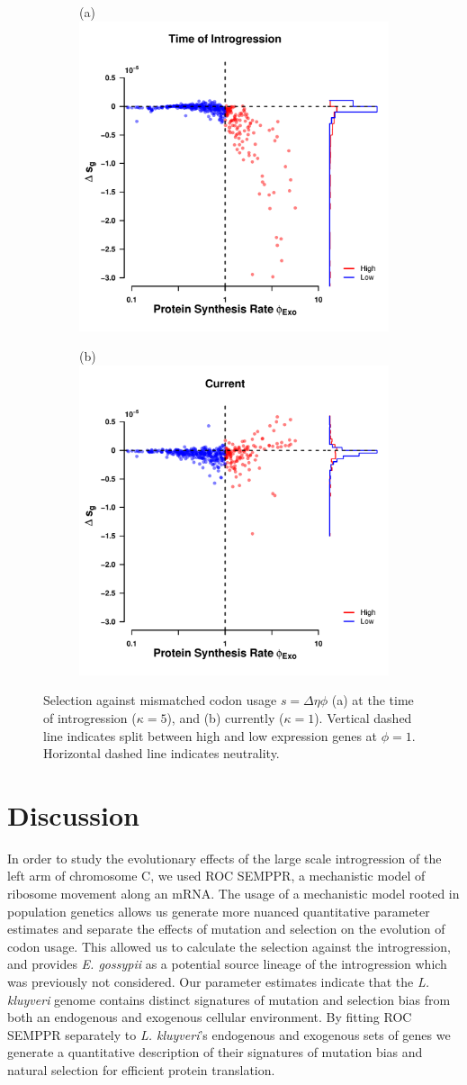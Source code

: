 \documentclass[doublespacing,linenumbers]{bmcart-modified}
\newcommand{\kluyveri}{\textit{L. kluyveri}\xspace}
\newcommand{\gossypii}{\textit{E. gossypii}\xspace}
\newcommand{\ROC}{ROC SEMPPR\xspace}
\newcommand{\DE}{\ensuremath{{\Delta \eta}}\xspace}
\begin{document}
\begin{figure}
    \centering
    \begin{subfigure}
        \centering
        (a) \includegraphics[width=.45\textwidth]{img/fig5a.pdf}%
    \end{subfigure}
    \begin{subfigure}
        \centering
        (b) \includegraphics[width=.45\textwidth]{img/fig5b.pdf}%
    \end{subfigure}
    \caption{Selection against mismatched codon usage $s = \DE \phi$ (a) at the time of introgression ($\kappa = 5$), and (b) currently ($\kappa = 1$). 
        Vertical dashed line indicates split between high and low expression genes at $\phi = 1$.
    	Horizontal dashed line indicates neutrality.}
    \label{fig:sne_fitness_burden}
\end{figure}


\section*{Discussion}
In order to study the evolutionary effects of the large scale introgression of the left arm of chromosome C, we used \ROC, a mechanistic model of ribosome movement along an mRNA.
The usage of a mechanistic model rooted in population genetics allows us generate more nuanced quantitative parameter estimates and separate the effects of mutation and selection on the evolution of codon usage.
This allowed us to calculate the selection against the introgression, and provides \gossypii as a potential source lineage of the introgression which was previously not considered.
Our parameter estimates indicate that the \kluyveri genome contains distinct signatures of mutation and selection bias from both an endogenous and exogenous cellular environment.
By fitting \ROC separately to \kluyveri's endogenous and exogenous sets of genes we generate a quantitative description of their signatures of mutation bias and natural selection for efficient protein translation.
\end{document}
